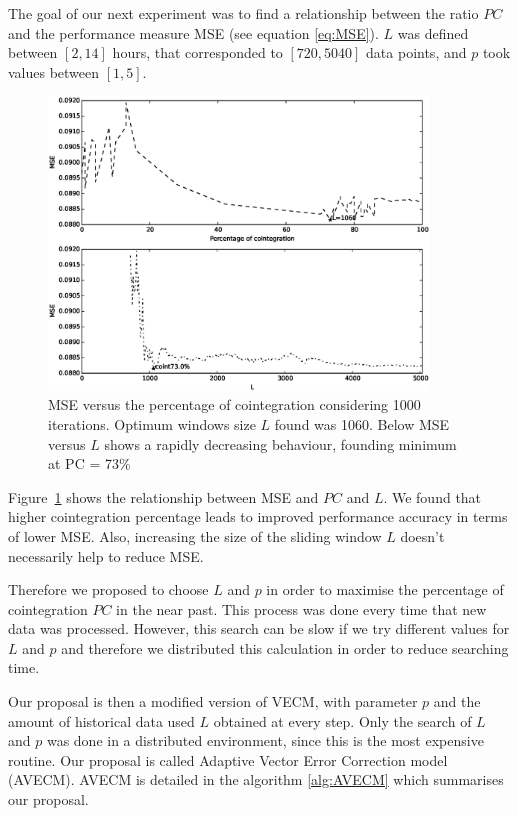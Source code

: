 The goal of our next experiment was to find a relationship between the ratio $PC$
and the performance measure MSE (see equation \ref{eq:MSE}). $L$ was defined
between $[2,14]$ hours, that corresponded to $[720, 5040]$ data points, and $p$
took values between $[1,5]$.  

\begin{figure}[ht!]
  \centering
   \includegraphics[width=0.9\textwidth]{img/Fig2}
  \caption{MSE versus the percentage of cointegration considering 1000
  iterations. Optimum windows size $L$ found was 1060. Below MSE versus $L$ shows a
  rapidly decreasing behaviour, founding minimum at PC = 73\% }
  \label{fig:cointvsmse}
\end{figure}

Figure~\ref{fig:cointvsmse} shows the relationship between MSE and $PC$ and $L$. We
found that higher cointegration percentage leads to improved performance accuracy
in terms of lower MSE. Also, increasing the size of the sliding window $L$
doesn't necessarily help to reduce MSE.

Therefore we proposed to choose $L$ and $p$ in order to maximise the percentage
of cointegration $PC$ in the near past. This process was done every time that
new data was processed. However, this search can be slow if we try different
values for $L$ and $p$ and therefore we distributed this calculation in order to
reduce searching time.

Our proposal is then a modified version of VECM, with parameter $p$ and the
amount of historical data used $L$ obtained at every step. Only the search of
$L$ and $p$ was done in a distributed environment, since this is the most
expensive routine. Our proposal is called Adaptive Vector Error Correction model
(AVECM). AVECM is detailed in the algorithm \ref{alg:AVECM} which summarises
our proposal.

